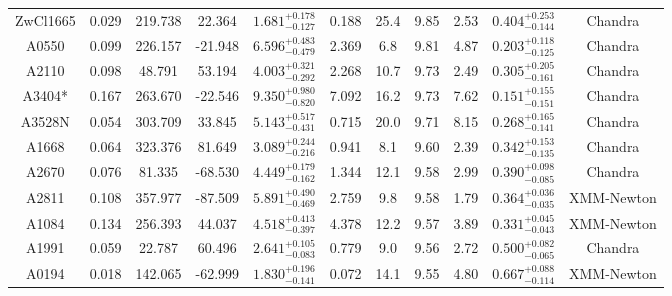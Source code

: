 \documentclass{aa}   %
\begin{document}
\begin{table}[h!]
\begin{center}
\begin{tabular}{ c  c  c  c c c c c c c c }
ZwCl1665            		&		0.029	&	219.738	&	22.364	& $	1.681^{+0.178}_{-0.127}$  &      0.188	&  25.4	&	9.85	&	2.53	&	$ 0.404^{+0.253}_{-0.144}  $ &	  Chandra     \\
A0550               		&		0.099	&	226.157	&	-21.948	& $	6.596^{+0.483}_{-0.479}$  &      2.369	&  6.8	&	9.81	&	4.87	&	$ 0.203^{+0.118}_{-0.125}  $ &	  Chandra     \\
A2110               		&		0.098	&	48.791	&	53.194	& $	4.003^{+0.321}_{-0.292}$  &      2.268	&  10.7	&	9.73	&	2.49	&	$ 0.305^{+0.205}_{-0.161}  $ &	  Chandra     \\
A3404*              		&		0.167	&	263.670	&	-22.546	& $	9.350^{+0.980}_{-0.820}$  &      7.092	&  16.2	&	9.73	&	7.62	&	$ 0.151^{+0.155}_{-0.151}  $ &	 Chandra      \\
A3528N              		&		0.054	&	303.709	&	33.845	& $	5.143^{+0.517}_{-0.431}$  &      0.715	&  20.0	&	9.71	&	8.15	&	$ 0.268^{+0.165}_{-0.141}  $ &	 Chandra      \\
A1668               		&		0.064	&	323.376	&	81.649	& $	3.089^{+0.244}_{-0.216}$  &      0.941	&  8.1	&	9.60	&	2.39	&	$ 0.342^{+0.153}_{-0.135}  $ &	  Chandra     \\
A2670               		&		0.076	&	81.335	&	-68.530	& $	4.449^{+0.179}_{-0.162}$  &      1.344	&  12.1	&	9.58	&	2.99	&	$ 0.390^{+0.098}_{-0.085}  $ &	  Chandra     \\
A2811               		&		0.108	&	357.977	&	-87.509	& $	5.891^{+0.490}_{-0.469}$  &      2.759	&  9.8	&	9.58	&	1.79	&	$ 0.364^{+0.036}_{-0.035}  $ &	  XMM-Newton  \\
A1084               		&		0.134	&	256.393	&	44.037	& $	4.518^{+0.413}_{-0.397}$  &      4.378	&  12.2	&	9.57	&	3.89	&	$ 0.331^{+0.045}_{-0.043}  $ &	  XMM-Newton  \\
A1991               		&		0.059	&	22.787	&	60.496	& $	2.641^{+0.105}_{-0.083}$  &      0.779	&  9.0	&	9.56	&	2.72	&	$ 0.500^{+0.082}_{-0.065}  $ &	  Chandra     \\
A0194               		&		0.018	&	142.065	&	-62.999	& $	1.830^{+0.196}_{-0.141}$  &      0.072	&  14.1	&	9.55	&	4.80	&	$ 0.667^{+0.088}_{-0.114}  $ &	  XMM-Newton  \\

 \hline 
 

\end{tabular}
\end{center}
\end{table}
\end{document}
